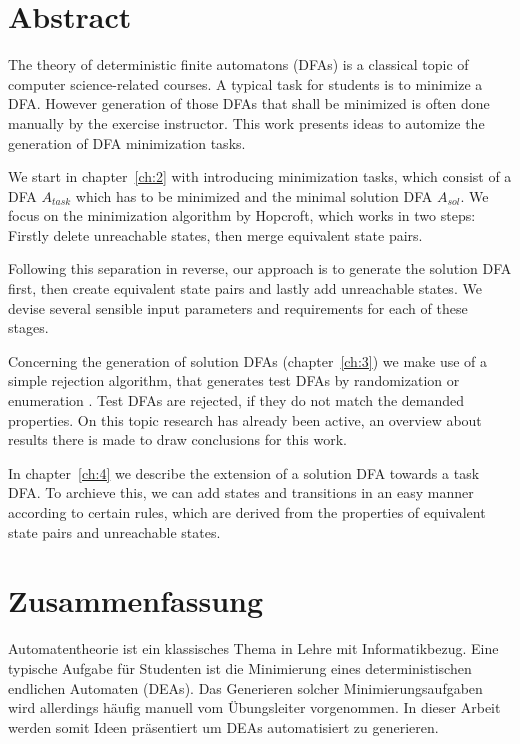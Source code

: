 
\chapter{Abstract}

The theory of deterministic finite automatons (DFAs) is a classical topic of computer science-related courses. A typical task for students is to minimize a DFA. However generation of those DFAs that shall be minimized is often done manually by the exercise instructor. This work presents ideas to automize the generation of DFA minimization tasks.

We start in chapter~\ref{ch:2} with introducing minimization tasks, which consist of a DFA $A_{task}$ which has to be minimized and the minimal solution DFA $A_{sol}$. We focus on the minimization algorithm by Hopcroft, which works in two steps: Firstly delete unreachable states, then merge equivalent state pairs.

Following this separation in reverse, our approach is to generate the solution DFA first, then create equivalent state pairs and lastly add unreachable states. We devise several sensible input parameters and requirements for each of these stages.

Concerning the generation of solution DFAs (chapter~\ref{ch:3}) we make use of a simple rejection algorithm, that generates test DFAs by randomization or enumeration . Test DFAs are rejected, if they do not match the demanded properties. On this topic research has already been active, an overview about results there is made to draw conclusions for this work.

In chapter~\ref{ch:4} we describe the extension of a solution DFA towards a task DFA. To archieve this, we can add states and transitions in an easy manner according to certain rules, which are derived from the properties of equivalent state pairs and unreachable states.



\chapter{Zusammenfassung}

Automatentheorie ist ein klassisches Thema in Lehre mit Informatikbezug. Eine typische Aufgabe für Studenten ist die Minimierung eines deterministischen endlichen Automaten (DEAs). Das Generieren solcher Minimierungsaufgaben wird allerdings häufig manuell vom Übungsleiter vorgenommen. In dieser Arbeit werden somit Ideen präsentiert um DEAs automatisiert zu generieren.

